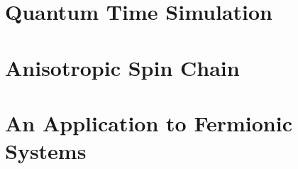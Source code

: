 \documentclass[12pt,twoside]{report}
\begin{document}
  \chapter{Quantum Time Simulation}
  
  \chapter{Anisotropic Spin Chain}
  
  \chapter{An Application to Fermionic Systems}
  
\end{document}
